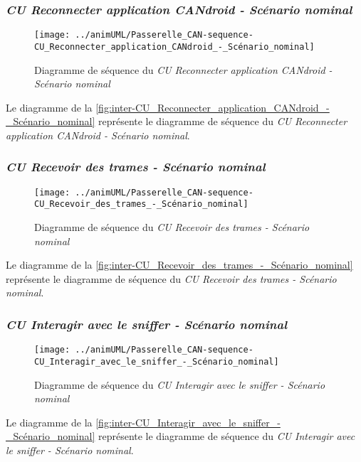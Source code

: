 \subsubsection{\emph{CU Reconnecter application CANdroid - Scénario nominal}}
\begin{figure}[H]
	\centering
	\texttt{[image: ../animUML/Passerelle\_CAN-sequence-CU\_Reconnecter\_application\_CANdroid\_-\_Scénario\_nominal]}
	\caption{Diagramme de séquence du \emph{CU Reconnecter application CANdroid - Scénario nominal}}
	\label{fig:inter-CU_Reconnecter_application_CANdroid_-_Scénario_nominal}
\end{figure}
Le diagramme de la \autoref{fig:inter-CU_Reconnecter_application_CANdroid_-_Scénario_nominal} représente le diagramme de séquence du \emph{CU Reconnecter application CANdroid - Scénario nominal}.


\subsubsection{\emph{CU Recevoir des trames - Scénario nominal}}
\begin{figure}[H]
	\centering
	\texttt{[image: ../animUML/Passerelle\_CAN-sequence-CU\_Recevoir\_des\_trames\_-\_Scénario\_nominal]}
	\caption{Diagramme de séquence du \emph{CU Recevoir des trames - Scénario nominal}}
	\label{fig:inter-CU_Recevoir_des_trames_-_Scénario_nominal}
\end{figure}
Le diagramme de la \autoref{fig:inter-CU_Recevoir_des_trames_-_Scénario_nominal} représente le diagramme de séquence du \emph{CU Recevoir des trames - Scénario nominal}.


\subsubsection{\emph{CU Interagir avec le sniffer - Scénario nominal}}
\begin{figure}[H]
	\centering
	\texttt{[image: ../animUML/Passerelle\_CAN-sequence-CU\_Interagir\_avec\_le\_sniffer\_-\_Scénario\_nominal]}
	\caption{Diagramme de séquence du \emph{CU Interagir avec le sniffer - Scénario nominal}}
	\label{fig:inter-CU_Interagir_avec_le_sniffer_-_Scénario_nominal}
\end{figure}
Le diagramme de la \autoref{fig:inter-CU_Interagir_avec_le_sniffer_-_Scénario_nominal} représente le diagramme de séquence du \emph{CU Interagir avec le sniffer - Scénario nominal}.


